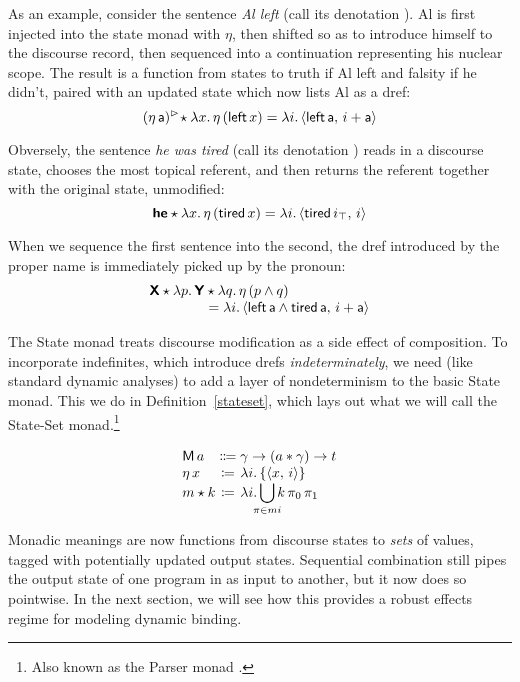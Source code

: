 As an example, consider the sentence \emph{Al left} (call its denotation ). Al is first injected into the state monad with $\eta$, then shifted so as to introduce himself to the discourse record, then sequenced into a continuation representing his nuclear scope. The result is a function from states to truth if Al left and falsity if he didn't, paired with an updated state which now lists Al as a dref:%
	\[(\eta\,\textsf{a})^\rhd\! \star \lambda x.\,\eta\,(\textsf{left}\,x) = \lambda i.\,\langle \textsf{left}\,\textsf{a},\,i+\textsf{a} \rangle\]%
	
\noindent
Obversely, the sentence \emph{he was tired} (call its denotation ) reads in a discourse state, chooses the most topical referent, and then returns the referent together with the original state, unmodified:%
	\[\textbf{\textsf{he}} \star \lambda x.\,\eta\,(\textsf{tired}\,x) = \lambda i.\,\langle \textsf{tired}\,i_\top,\,i \rangle\]%
	
\noindent
When we sequence the first sentence into the second, the dref introduced by the proper name is immediately picked up by the pronoun: %
	\[\begin{array}{r@{}l}
		\bsf{X} \star \lambda p.\,\bsf{Y}&{}\star \lambda q.\,\eta\,(p \wedge q) %
		\\
		&{}= \lambda i.\,\ab{\textsf{left}\,\textsf{a} \wedge \textsf{tired}\,\textsf{a},\,i+\textsf{a}}%
	\end{array}\]
	
  The State monad treats discourse modification as a side effect of composition. To incorporate indefinites, which introduce drefs \emph{indeterminately}, we need (like standard dynamic analyses) to add a layer of nondeterminism to the basic State monad. This we do in Definition~\ref{stateset}, which lays out what we will call the State-Set monad.\footnote{Also known as the Parser monad \citep{HuttonMeijer}.}%
	\begin{defi}\label{stateset}
		\[\begin{array}[t]
			{@{}l@{}c@{}l@{}}
			\textsf{M}\,a &{}\Coloneqq{} &\gamma \ra (a \ast \gamma) \ra t%
			\\
			\eta\,x &{}\ceq{} &\lambda i.\,\{\ab{x,\,i}\}
			\\
			m \star k &{}\ceq{} &\lambda i.\displaystyle\bigcup_{\mathclap{\pi \in mi}}k\,\pi_0\,\pi_1%
		\end{array}\]
	\end{defi}

  Monadic meanings are now functions from discourse states to \emph{sets} of values, tagged with potentially updated output states. Sequential combination still pipes the output state of one program in as input to another, but it now does so pointwise. In the next section, we will see how this provides a robust effects regime for modeling dynamic binding. %

